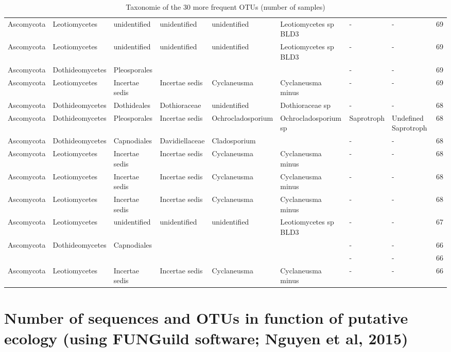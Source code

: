 \documentclass[12pt]{article}\usepackage[]{graphicx}\usepackage[]{color}
\numberwithin{figure}{section}
\begin{document}
\begin{landscape}
\begin{table}[ht]
\begin{tabular}{llllllllr}
  Ascomycota & Leotiomycetes & unidentified & unidentified & unidentified & Leotiomycetes sp BLD3 & - & - & 69 \\ 
  Ascomycota & Leotiomycetes & unidentified & unidentified & unidentified & Leotiomycetes sp BLD3 & - & - & 69 \\ 
  Ascomycota & Dothideomycetes & Pleosporales &  &  &  & - & - & 69 \\ 
  Ascomycota & Leotiomycetes & Incertae sedis & Incertae sedis & Cyclaneusma & Cyclaneusma minus & - & - & 69 \\ 
  Ascomycota & Dothideomycetes & Dothideales & Dothioraceae & unidentified & Dothioraceae sp & - & - & 68 \\ 
  Ascomycota & Dothideomycetes & Pleosporales & Incertae sedis & Ochrocladosporium & Ochrocladosporium sp & Saprotroph & Undefined Saprotroph & 68 \\ 
  Ascomycota & Dothideomycetes & Capnodiales & Davidiellaceae & Cladosporium &  & - & - & 68 \\ 
  Ascomycota & Leotiomycetes & Incertae sedis & Incertae sedis & Cyclaneusma & Cyclaneusma minus & - & - & 68 \\ 
  Ascomycota & Leotiomycetes & Incertae sedis & Incertae sedis & Cyclaneusma & Cyclaneusma minus & - & - & 68 \\ 
  Ascomycota & Leotiomycetes & Incertae sedis & Incertae sedis & Cyclaneusma & Cyclaneusma minus & - & - & 68 \\ 
  Ascomycota & Leotiomycetes & unidentified & unidentified & unidentified & Leotiomycetes sp BLD3 & - & - & 67 \\ 
  Ascomycota & Dothideomycetes & Capnodiales &  &  &  & - & - & 66 \\ 
   &  &  &  &  &  & - & - & 66 \\ 
  Ascomycota & Leotiomycetes & Incertae sedis & Incertae sedis & Cyclaneusma & Cyclaneusma minus & - & - & 66 \\ 
   \hline
\end{tabular}
\endgroup
\caption{Taxonomie of the 30 more frequent OTUs (number of samples)} 
\end{table}

\end{landscape}


\section{Number of sequences and OTUs in function of putative ecology (using FUNGuild software; Nguyen et al, 2015)}
\end{document}
